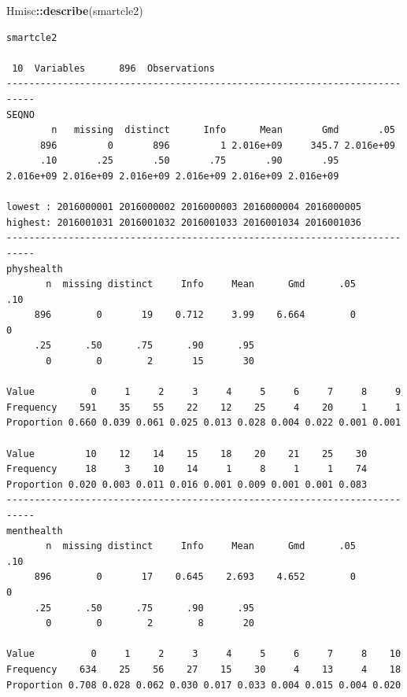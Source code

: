 \documentclass[]{book}
\newenvironment{Shaded}{\begin{snugshade}}{\end{snugshade}}
\newcommand{\KeywordTok}[1]{\textcolor[rgb]{0.13,0.29,0.53}{\textbf{#1}}}
\newcommand{\OperatorTok}[1]{\textcolor[rgb]{0.81,0.36,0.00}{\textbf{#1}}}
\newcommand{\NormalTok}[1]{#1}
\theoremstyle{definition}
\theoremstyle{definition}
\theoremstyle{definition}
\theoremstyle{remark}
\begin{document}
\begin{Shaded}
\begin{Highlighting}[]
\NormalTok{Hmisc}\OperatorTok{::}\KeywordTok{describe}\NormalTok{(smartcle2)}
\end{Highlighting}
\end{Shaded}

\begin{verbatim}
smartcle2 

 10  Variables      896  Observations
---------------------------------------------------------------------------
SEQNO 
        n   missing  distinct      Info      Mean       Gmd       .05 
      896         0       896         1 2.016e+09     345.7 2.016e+09 
      .10       .25       .50       .75       .90       .95 
2.016e+09 2.016e+09 2.016e+09 2.016e+09 2.016e+09 2.016e+09 

lowest : 2016000001 2016000002 2016000003 2016000004 2016000005
highest: 2016001031 2016001032 2016001033 2016001034 2016001036
---------------------------------------------------------------------------
physhealth 
       n  missing distinct     Info     Mean      Gmd      .05      .10 
     896        0       19    0.712     3.99    6.664        0        0 
     .25      .50      .75      .90      .95 
       0        0        2       15       30 
                                                                      
Value          0     1     2     3     4     5     6     7     8     9
Frequency    591    35    55    22    12    25     4    20     1     1
Proportion 0.660 0.039 0.061 0.025 0.013 0.028 0.004 0.022 0.001 0.001
                                                                
Value         10    12    14    15    18    20    21    25    30
Frequency     18     3    10    14     1     8     1     1    74
Proportion 0.020 0.003 0.011 0.016 0.001 0.009 0.001 0.001 0.083
---------------------------------------------------------------------------
menthealth 
       n  missing distinct     Info     Mean      Gmd      .05      .10 
     896        0       17    0.645    2.693    4.652        0        0 
     .25      .50      .75      .90      .95 
       0        0        2        8       20 
                                                                      
Value          0     1     2     3     4     5     6     7     8    10
Frequency    634    25    56    27    15    30     4    13     4    18
Proportion 0.708 0.028 0.062 0.030 0.017 0.033 0.004 0.015 0.004 0.020
                                                    

\end{verbatim}
\end{document}
